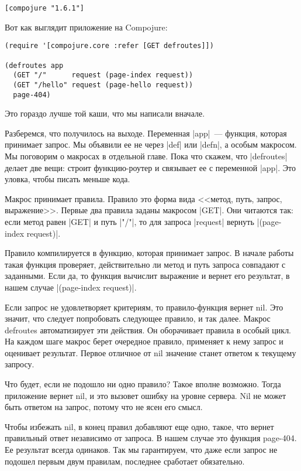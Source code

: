 \begin{verbatim}
[compojure "1.6.1"]
\end{verbatim}

\noindent
Вот как выглядит приложение на Compojure:

\begin{verbatim}
(require '[compojure.core :refer [GET defroutes]])

(defroutes app
  (GET "/"      request (page-index request))
  (GET "/hello" request (page-hello request))
  page-404)
\end{verbatim}

\noindent
Это гораздо лучше той каши, что мы написали вначале.

Разберемся, что получилось на выходе. Переменная \spverb|app|~--- функция, которая
принимает запрос. Мы объявили ее не через \spverb|def| или \spverb|defn|,
а особым макросом. Мы поговорим о макросах в отдельной главе. Пока что
скажем, что \spverb|defroutes| делает две вещи: строит функцию-роутер и связывает ее с
переменной \spverb|app|. Это уловка, чтобы писать меньше кода.

Макрос принимает правила. Правило это форма вида <<метод, путь, запрос,
выражение>>. Первые два правила заданы макросом \spverb|GET|. Они читаются так: если
метод равен \spverb|GET| и путь \spverb|"/"|, то для запроса \spverb|request|
вернуть \spverb|(page-index request)|.


Правило компилируется в функцию, которая принимает запрос. В начале работы такая
функция проверяет, действительно ли метод и путь запроса совпадают с
заданными. Если да, то функция вычислит выражение и вернет его результат, в
нашем случае \spverb|(page-index request)|.

Если запрос не удовлетворяет критериям, то правило-функция вернет nil. Это
значит, что следует попробовать следующее правило, и так далее. Макрос defroutes
автоматизирует эти действия. Он оборачивает правила в особый цикл. На каждом
шаге макрос берет очередное правило, применяет к нему запрос и оценивает
результат. Первое отличное от nil значение станет ответом к текущему запросу.

Что будет, если не подошло ни одно правило? Такое вполне возможно. Тогда
приложение вернет nil, и это вызовет ошибку на уровне сервера. Nil не может быть
ответом на запрос, потому что не ясен его смысл.

Чтобы избежать nil, в конец правил добавляют еще одно, такое, что вернет
правильный ответ независимо от запроса. В нашем случае это функция page-404. Ее
результат всегда одинаков. Так мы гарантируем, что даже если запрос не подошел
первым двум правилам, последнее сработает обязательно.

